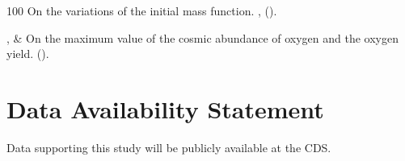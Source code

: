 \documentclass{nature2}
\begin{document}
\begin{thebibliography}{100}
\newblock On the variations of the initial mass function.
\newblock \emph{} \textbf{},
 ().

,
 \& 
\newblock On the maximum value of the cosmic abundance of oxygen and the oxygen yield.
\newblock \emph{}
 ().


\end{thebibliography}

\section{Data Availability Statement}
Data supporting this study will be publicly available at the CDS.
\end{document}
